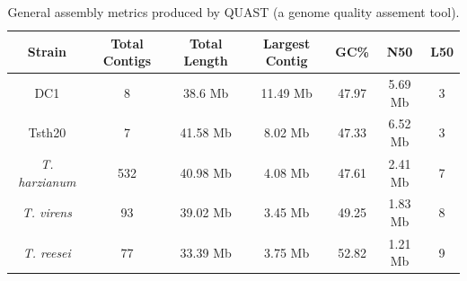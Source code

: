 \begin{table}
  \begin{center}
    \begin{tabular}{|c|c|c|c|c|c|c|}
      \hline
      Strain & Total Contigs & Total Length & Largest Contig & GC\% & N50 & L50 \\ \hline
      DC1 & 8 & 38.6 Mb & 11.49 Mb & 47.97 & 5.69 Mb & 3 \\ \hline
      Tsth20 & 7 & 41.58 Mb & 8.02 Mb & 47.33 & 6.52 Mb & 3 \\ \hline
      \textit{T. harzianum} & 532 & 40.98 Mb & 4.08 Mb & 47.61 & 2.41 Mb & 7 \\ \hline
      \textit{T. virens} & 93 & 39.02 Mb & 3.45 Mb & 49.25 & 1.83 Mb & 8 \\ \hline
      \textit{T. reesei} & 77 & 33.39 Mb & 3.75 Mb & 52.82 & 1.21 Mb & 9 \\ \hline
    \end{tabular}
  \end{center}
  \caption{General assembly metrics produced by QUAST (a
    genome quality assement tool).}
  \label{table:assemblies}
\end{table}


